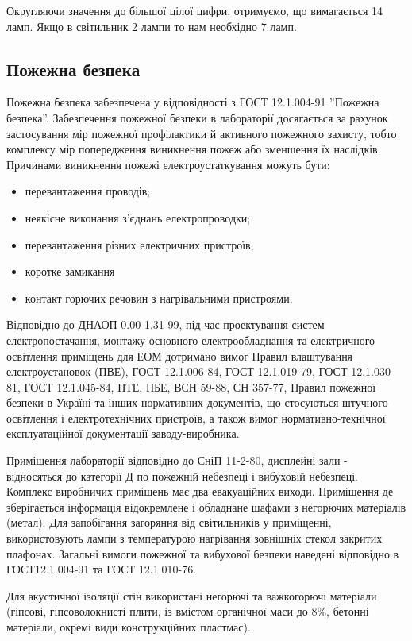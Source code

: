 Округляючи значення до більшої цілої цифри, отримуємо, що вимагається 14 ламп. Якщо в світильник 2 лампи то нам необхідно
7 ламп.

\subsection{Пожежна безпека}
Пожежна безпека забезпечена у відповідності з ГОСТ 12.1.004-91 ”Пожежна безпека”. 
Забезпечення пожежної безпеки в 
лабораторії досягається за рахунок застосування мір пожежної профілактики 
й активного пожежного захисту, тобто комплексу мір попередження виникнення 
пожеж або зменшення їх наслідків. Причинами виникнення пожежі 
електроустаткування можуть бути:
\begin{itemize}
 \item перевантаження проводів;
 \item неякісне виконання з'єднань електропроводки;
 \item перевантаження різних електричних пристроїв;
 \item коротке замикання
 \item контакт горючих речовин з нагрівальними пристроями.
\end{itemize}

Відповідно до ДНАОП 0.00-1.31-99, під час проектування систем електропостачання, монтажу 
основного електрообладнання та електричного освітлення приміщень для ЕОМ дотримано вимог 
Правил влаштування електроустановок (ПВЕ), ГОСТ 12.1.006-84, ГОСТ 12.1.019-79, ГОСТ 12.1.030-81, 
ГОСТ 12.1.045-84, ПТЕ, ПБЕ, ВСН 59-88,  СН 357-77, Правил пожежної безпеки в Україні та 
інших нормативних документів, що стосуються штучного освітлення і електротехнічних пристроїв, 
а також вимог нормативно-технічної експлуатаційної документації заводу-виробника.

Приміщення лабораторії відповідно до СніП 11-2-80, дисплейні зали - відносяться до категорії Д 
по пожежній небезпеці і вибуховій небезпеці. Комплекс виробничих приміщень має два евакуаційних виходи.
Приміщення де зберігається інформація відокремлене і  обладнане шафами з негорючих матеріалів (метал).
Для запобігання загоряння від світильників у приміщенні, використовують лампи з температурою нагрівання зовнішніх стекол закритих плафонах.
Загальні вимоги пожежної та вибухової безпеки наведені відповідно в ГОСТ12.1.004-91 та ГОСТ 12.1.010-76.

Для акустичної ізоляції стін використані негорючі та важкогорючі матеріали (гіпсові, гіпсоволокнисті 
плити, із вмістом органічної маси до 8\%, бетонні матеріали, окремі види конструкційних пластмас).

